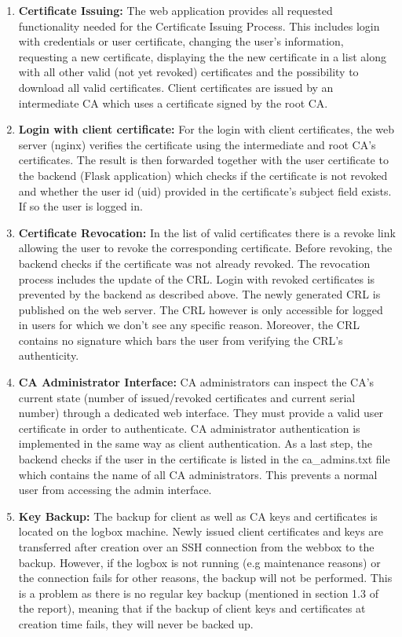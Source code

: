 \documentclass[english]{article}
\begin{document}
\begin{enumerate}

\item \textbf{Certificate Issuing:}
The web application provides all requested functionality needed for the Certificate Issuing Process. This includes login with credentials or user certificate, changing the user's information, requesting a new certificate, displaying the the new certificate in a list along with all other valid (not yet revoked) certificates and the possibility to download all valid certificates. Client certificates are issued by an intermediate CA which uses a certificate signed by the root CA. 

\item \textbf {Login with client certificate:}
For the login with client certificates, the web server (nginx) verifies the certificate using the intermediate and root CA's certificates. The result is then forwarded together with the user certificate to the backend (Flask application) which checks if the certificate is not revoked and whether the user id (uid) provided in the certificate's subject field exists. If so the user is logged in.

\item \textbf{Certificate Revocation:}
In the list of valid certificates there is a revoke link allowing the user to revoke the corresponding certificate. Before revoking, the backend  checks if the certificate was not already revoked. The revocation process includes the update of the CRL. Login with revoked certificates is prevented by the backend as described above. The newly generated CRL is published on the web server. The CRL however is only accessible for logged in users for which we don't see any specific reason. Moreover, the CRL contains no signature which bars the user from verifying the CRL's authenticity.

\item \textbf{CA Administrator Interface:}
CA administrators can inspect the CA's current state (number of issued/revoked certificates and current serial number) through a dedicated web interface. They must provide a valid user certificate in order to authenticate. CA administrator authentication is implemented in the same way as client authentication. As a last step, the backend checks if the user in the certificate is listed in the ca\_admins.txt file which contains the name of all CA administrators. This prevents a normal user from accessing the admin interface.

\item \textbf{Key Backup:}
The backup for client as well as CA keys and certificates is located on the logbox machine. Newly issued client certificates and keys are transferred after creation over an SSH connection from the webbox to the backup. However, if the logbox is not running (e.g maintenance reasons) or the connection fails for other reasons, the backup will not be performed. This is a problem as there is no regular key backup (mentioned in section 1.3 of the report), meaning that if the backup of client keys and certificates at creation time fails, they will never be backed up.


\end{enumerate}
\end{document}
